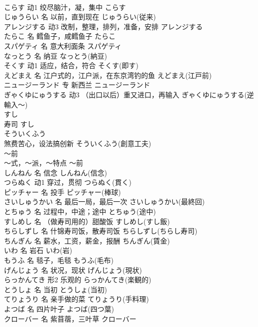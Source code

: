 \documentclass[8pt]{extreport}
\begin{document}
\begin{CJK}{UTF8}{min}
\\	こらす	动1	绞尽脑汁，凝，集中	こらす	
\\	じゅうらい	名	以前，直到现在	じゅうらい(従来)	
\\	アレンジする	动3	改制，整理，排列，准备，安排	アレンジする	
\\	たらこ	名	鳕鱼子，咸鳕鱼子	たらこ	
\\	スパゲティ	名	意大利面条	スパゲティ	
\\	なっとう	名	纳豆	なっとう(納豆)	
\\	そくす	动1	适应，结合，符合	そくす(即す)	
\\	えどまえ	名	江户式的，江户派，在东京湾钓的鱼	えどまえ(江戸前)	
\\	ニュージーランド	专	新西兰	ニュージーランド	
\\	ぎゃくゆにゅうする	动3	（出口以后）重又进口，再输入	ぎゃくゆにゅうする(逆輸入～)	
\\	すし	
\\	寿司	すし
\\	そういくふう	
\\	煞费苦心，设法搞创新	そういくふう(創意工夫)	
\\	～前	
\\	～式，～派，～特点	～前	
\\	しんねん	名	信念	しんねん(信念)	
\\	つらぬく	动1	穿过，贯彻	つらぬく(貫く)	
\\	ピッチャー	名	投手	ピッチャー(棒球)	
\\	さいしゅうかい	名	最后一局，最后一次	さいしゅうかい(最終回)	
\\	とちゅう	名	过程中，中途；途中	とちゅう(途中)	
\\	すしめし	名	（做寿司用的）甜酸饭	すしめし(すし飯)	
\\	ちらしずし	名	什锦寿司饭，散寿司饭	ちらしずし(ちらし寿司)	
\\	ちんぎん	名	薪水，工资，薪金，报酬	ちんぎん(賃金)	
\\	いわ	名	岩石	いわ(岩)	
\\	もうふ	名	毯子，毛毯	もうふ(毛布)	
\\	げんじょう	名	状况，现状	げんじょう(現状)	
\\	らっかんてき	形2	乐观的	らっかんてき(楽観的)	
\\	とうしょ	名	当初	とうしょ(当初)	
\\	てりょうり	名	亲手做的菜	てりょうり(手料理)	
\\	よつば	名	四片叶子	よつば(四つ葉)	
\\	クローバー	名	紫苜蓿，三叶草	クローバー	

\end{CJK}
\end{document}
